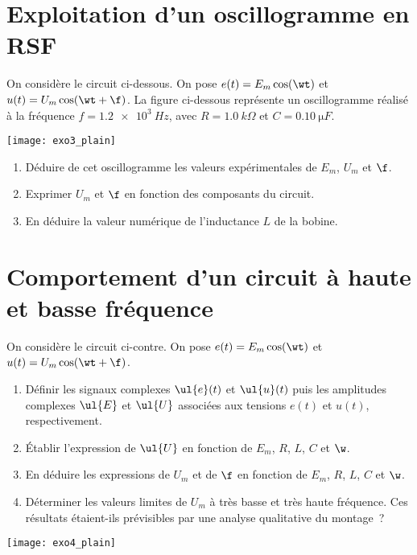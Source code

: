 \documentclass[a4paper, 12pt, final, garamond]{book}
\begin{document}
\section{Exploitation d'un oscillogramme en RSF}
On considère le circuit ci-dessous. On pose $e(t) = E_m\cos(\wt)$ et $u(t) =
U_m\cos(\wt+\f)$. La figure ci-dessous représente un oscillogramme réalisé à la
fréquence $f = \SI{1.2e3}{Hz}$, avec $R = \SI{1.0}{k\Omega}$ et $C =
\SI{0.10}{\micro F}$.
\begin{center}
    \texttt{[image: exo3\_plain]}
\end{center}
\begin{enumerate}
    \item Déduire de cet oscillogramme les valeurs expérimentales de $E_m$,
        $U_m$ et $\f$.
    \item Exprimer $U_m$ et $\f$ en fonction des composants du circuit.
    \item En déduire la valeur numérique de l'inductance $L$ de la bobine.
\end{enumerate}

\section{Comportement d'un circuit à haute et basse fréquence}
On considère le circuit ci-contre. On pose $e(t) = E_m\cos(\wt)$ et $u(t) =
U_m\cos(\wt+\f)$.

\begin{minipage}{0.60\linewidth}
    \begin{enumerate}
        \item Définir les signaux complexes $\ul{e}(t)$ et $\ul{u}(t)$ puis les
            amplitudes complexes $\ul{E}$ et $\ul{U}$ associées aux tensions
            $e(t)$ et $u(t)$, respectivement.
        \item Établir l'expression de $\ul{U}$ en fonction de $E_m$, $R$, $L$,
            $C$ et $\w$.
        \item En déduire les expressions de $U_m$ et de $\f$ en fonction de
            $E_m$, $R$, $L$, $C$ et $\w$.
        \item Déterminer les valeurs limites de $U_m$ à très basse et très haute
            fréquence. Ces résultats étaient-ils prévisibles par une analyse
            qualitative du montage~?
    \end{enumerate}
\end{minipage}
\hfill
\begin{minipage}{0.35\linewidth}
    \begin{center}
        \texttt{[image: exo4\_plain]}
    \end{center}
\end{minipage}
\end{document}
